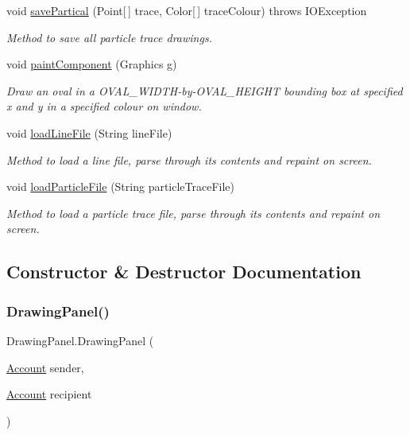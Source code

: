 \begin{DoxyCompactItemize}
void \hyperlink{class_drawing_panel_a3c4bdf70ae72b099b258040244f9d428}{save\+Partical} (Point\mbox{[}$\,$\mbox{]} trace, Color\mbox{[}$\,$\mbox{]} trace\+Colour)  throws I\+O\+Exception 
\begin{DoxyCompactList}\small\item\em Method to save all particle trace drawings. \end{DoxyCompactList}\item 
void \hyperlink{class_drawing_panel_a94f31c4cf6856ae742da17f00d8b33e4}{paint\+Component} (Graphics g)
\begin{DoxyCompactList}\small\item\em Draw an oval in a O\+V\+A\+L\+\_\+\+W\+I\+D\+T\+H-\/by-\/\+O\+V\+A\+L\+\_\+\+H\+E\+I\+G\+HT bounding box at specified x and y in a specified colour on window. \end{DoxyCompactList}\item 
void \hyperlink{class_drawing_panel_a72ba678075cd06d0455dddfe2509da83}{load\+Line\+File} (String line\+File)
\begin{DoxyCompactList}\small\item\em Method to load a line file, parse through its contents and repaint on screen. \end{DoxyCompactList}\item 
void \hyperlink{class_drawing_panel_a2c3c19d065415dfffacfb2ded1fb114a}{load\+Particle\+File} (String particle\+Trace\+File)
\begin{DoxyCompactList}\small\item\em Method to load a particle trace file, parse through its contents and repaint on screen. \end{DoxyCompactList}\end{DoxyCompactItemize}


\subsection{Constructor \& Destructor Documentation}
\mbox{\label{class_drawing_panel_a63d04db10fba53e2b46d536525d278ac}} 
\subsubsection{\texorpdfstring{Drawing\+Panel()}{DrawingPanel()}}
{\footnotesize\ttfamily Drawing\+Panel.\+Drawing\+Panel (\begin{DoxyParamCaption}\item[{\hyperlink{class_account}{Account}}]{sender,  }\item[{\hyperlink{class_account}{Account}}]{recipient }\end{DoxyParamCaption})}



